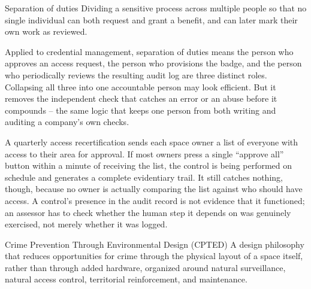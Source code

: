 \begin{definition}{Separation of duties}
Dividing a sensitive process across multiple people so that no single individual can both request
and grant a benefit, and can later mark their own work as reviewed.
\end{definition}

Applied to credential management, separation of duties means the person who approves an access
request, the person who provisions the badge, and the person who periodically reviews the resulting
audit log are three distinct roles. Collapsing all three into one accountable person may look
efficient. But it removes the independent check that catches an error or an abuse before it
compounds -- the same logic that keeps one person from both writing and auditing a company's own
checks.

\begin{example}
A quarterly access recertification sends each space owner a list of everyone with access to their
area for approval. If most owners press a single ``approve all'' button within a minute of
receiving the list, the control is being performed on schedule and generates a complete evidentiary
trail. It still catches nothing, though, because no owner is actually comparing the list against
who should have access. A control's presence in the audit record is not evidence that it functioned;
an assessor has to check whether the human step it depends on was genuinely exercised, not merely
whether it was logged.
\end{example}

\begin{definition}{Crime Prevention Through Environmental Design (CPTED)}
A design philosophy that reduces opportunities for crime through the physical layout of a space
itself, rather than through added hardware, organized around natural surveillance, natural access
control, territorial reinforcement, and maintenance.
\end{definition}

